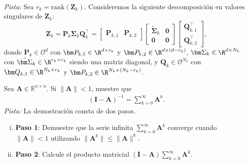 \documentclass[../../book-main.tex]{subfiles}
\begin{document}
\begin{exercise}
\begin{enumerate}
\begin{align*}
            \end{align*}
            {\em Pista:} Sea $r_k=\mathrm{rank}(\bm Z_k)$. Consideremos la
            siguiente descomposición en valores singulares de $\bm Z_k$:
            \begin{equation}
                \bm Z_k = \bm P_k\bm \Sigma_k\bm Q_k^\top =
                \begin{bmatrix}
                    \bm P_{k,1} & \bm P_{k,2}
                \end{bmatrix}
                \begin{bmatrix}
                    \tilde{\bm \Sigma}_{k} & \bm 0 \\
                    \bm 0 & \bm 0
                \end{bmatrix}
                \begin{bmatrix}
                    \bm Q_{k,1}^\top \\ \bm Q_{k,2}^\top
                \end{bmatrix},
            \end{equation}
            donde $\bm P_k \in \mathcal{O}^d$ con $\bm P_{k,1} \in
            \R^{d\times r_k}$ y  $\bm P_{k,2} \in \R^{d\times (d-r_k)}$,
            $\bm \Sigma_k \in \R^{d\times N_k}$ con $\tilde{\bm \Sigma}_{k}
            \in \R^{r_k\times r_k}$ siendo una matriz diagonal, y  $\bm Q_k
            \in \mathcal{O}^{N_k}$ con $\bm Q_{k,1} \in \R^{N_k\times r_k}$
            y  $\bm P_{k,2} \in \R^{N_k \times (N_k-r_k)}$.
    \end{enumerate}
\end{exercise}

\begin{exercise}\label{ex:neumannn}
    Sea $\bm A \in \mathbb{R}^{n\times n}$. Si $\|\bm A\| < 1$, muestre que
    \begin{align}\label{eq:neumann}
        \left( \bm I - \bm A\right)^{-1} = \sum_{k=0}^\infty \bm A^k.
    \end{align}
    {\em Pista:} La demostración consta de dos pasos.
    \begin{enumerate}[(i)]
        \item {\bf Paso 1}: Demuestre que la serie infinita
            $\sum_{k=0}^\infty \bm A^k$ converge cuando $\|\bm A\| < 1$ utilizando
            $\|\bm A^k\| \le \|\bm A\|^k$.
        \item {\bf Paso 2}: Calcule el producto matricial $(\bm I - \bm A)
            \sum_{k=0}^\infty \bm A^k$.
    \end{enumerate}
\end{exercise}
\end{document}
